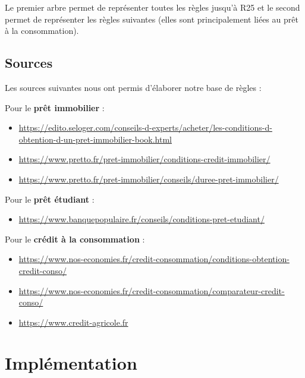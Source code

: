 \documentclass[
]{article}
\begin{document}
Le premier arbre permet de représenter toutes les règles jusqu'à R25 et
le second permet de représenter les règles suivantes (elles sont
principalement liées au prêt à la consommation).




\hypertarget{sources}{%
\subsection{Sources}\label{sources}}

Les sources suivantes nous ont permis d'élaborer notre base de règles :

Pour le \textbf{prêt immobilier} : \\
\begin{itemize}
\item
\url{https://edito.seloger.com/conseils-d-experts/acheter/les-conditions-d-obtention-d-un-pret-immobilier-book.html} \\
\item
\url{https://www.pretto.fr/pret-immobilier/conditions-credit-immobilier/} \\
\item
\url{https://www.pretto.fr/pret-immobilier/conseils/duree-pret-immobilier/} \\
\end{itemize}
Pour le \textbf{prêt étudiant} : \\
\begin{itemize}
\item
\url{https://www.banquepopulaire.fr/conseils/conditions-pret-etudiant/} \\
\end{itemize}
Pour le \textbf{crédit à la consommation} : \\
\begin{itemize}
\item
\url{https://www.nos-economies.fr/credit-consommation/conditions-obtention-credit-conso/} \\
\item
\url{https://www.nos-economies.fr/credit-consommation/comparateur-credit-conso/} \\
\item
\url{https://www.credit-agricole.fr} \\
\end{itemize}

\pagebreak

\hypertarget{impluxe9mentation}{%
\section{Implémentation}\label{impluxe9mentation}}
\end{document}

